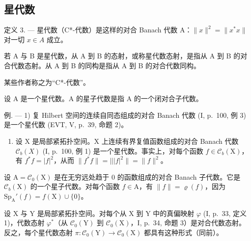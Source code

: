 \subsection{星代数}

定义 3. --- 星代数（C*-代数）是这样的对合 Banach 代数 A：\(\|x\|^{2}=\|x^{*}x\|\) 对一切 \(x\in A\) 成立。

若 A 与 B 是星代数，从 A 到 B 的态射，或称星代数态射，是指从 A 到 B 的对合代数态射。从 A 到 B 的同构是指从 A 到 B 的对合代数同构。

某些作者称之为“C*-代数”。

设 A 是一个星代数。A 的星子代数是指 A 的一个闭对合子代数。

例. --- 1) 复 Hilbert 空间的连续自同态组成的对合 Banach 代数 (I, p.~100, 例 3) 是一个星代数 (EVT, V, p.~39, 命题 2)。

\begin{enumerate}
\def\labelenumi{\arabic{enumi})}
\setcounter{enumi}{1}
\tightlist
\item
  设 X 是局部紧拓扑空间。X 上连续有界复值函数组成的对合 Banach 代数 \(\mathcal{C}_{b}(X)\) (I, p.~100, 例 1) 是一个星代数。事实上，对每个函数 \(f \in \mathcal{C}_b(\mathrm{X})\)，有 \(f^*f = |f|^2\)，从而 \(\| f^*f \| = |||f|^2 \| = \| f\|^2\)。
\end{enumerate}

设 \(\mathrm{A} = \mathcal{C}_0(\mathrm{X})\) 是在无穷远处趋于 0 的函数组成的对合 Banach 子代数。它是 \(\mathcal{C}_b(\mathrm{X})\) 的一个星子代数。对每个函数 \(f \in \mathrm{A}\)，有 \(\| f \| = \varrho(f)\)，因为 \(\mathrm{Sp}_{\mathrm{A}}'(f) = f(\mathrm{X}) \cup \{0\}\)。

设 X 与 Y 是局部紧拓扑空间。对每个从 X 到 Y 中的真偏映射 \(\varphi\) (I, p.~33, 定义 1)，代数态射 \(\varphi^{*}\)（从 \(\mathcal{C}_{0}(\mathrm{Y})\) 到 \(\mathcal{C}_{0}(\mathrm{X})\)，I, p.~34, 命题 3）是对合代数态射。反之，每个星代数态射 \(\pi\colon\mathcal{C}_{0}(\mathrm{Y})\to\mathcal{C}_{0}(\mathrm{X})\) 都具有这种形式（同前）。

